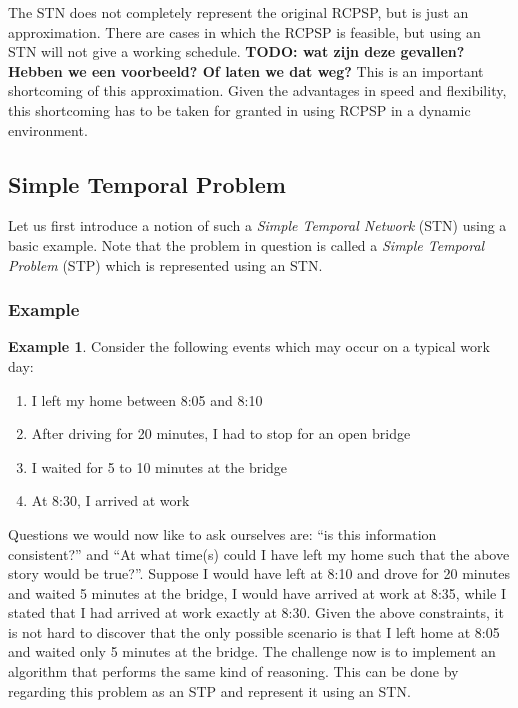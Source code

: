\documentclass{article}
\theoremstyle{definition}
\newcommand{\TODO}[1]{{\color{red}\textbf{TODO: #1}}}
\newtheorem{example}{Example}[section]
\begin{document}
The STN does not completely represent the original RCPSP, but is just an approximation.
There are cases in which the RCPSP is feasible, but using an STN will not give a working schedule.
\TODO{wat zijn deze gevallen? Hebben we een voorbeeld? Of laten we dat weg?}
This is an important shortcoming of this approximation.
Given the advantages in speed and flexibility, this shortcoming has to be taken for granted in using RCPSP in a dynamic environment.

\subsection{Simple Temporal Problem}
\label{text:STN}
Let us first introduce a notion of such a \emph{Simple Temporal Network} (STN) using a basic example. 
Note that the problem in question is called a \emph{Simple Temporal Problem} (STP) which is represented using an STN.

\subsubsection{Example}
\begin{example}
\label{exmp:stn}
Consider the following events which may occur on a typical work day:
\begin{enumerate}
\item I left my home between 8:05 and 8:10
\item After driving for 20 minutes, I had to stop for an open bridge
\item I waited for 5 to 10 minutes at the bridge
\item At 8:30, I arrived at work 
\end{enumerate}
\end{example}

Questions we would now like to ask ourselves are: ``is this information consistent?'' and ``At what time(s) could I have left my home such that the above story would be true?''. 
Suppose I would have left at 8:10 and drove for 20 minutes and waited 5 minutes at the bridge, I would have arrived at work at 8:35, while I stated that I had arrived at work exactly at 8:30. 
Given the above constraints, it is not hard to discover that the only possible scenario is that I left home at 8:05 and waited only 5 minutes at the bridge.
The challenge now is to implement an algorithm that performs the same kind of reasoning.  This can be done by regarding this problem as an STP and represent it using an STN.
\end{document}
